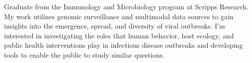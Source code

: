 
\begin{cvparagraph}

    Graduate from the Immunology and Microbiology program at Scripps Research.
    My work utilizes genomic surveillance and multimodal data sources to gain insights into the emergence, spread, and diversity of viral outbreaks.
    I'm interested in investigating the roles that human behavior, host ecology, and public health interventions play in infectious disease outbreaks and developing tools to enable the         public to study similar questions. 
\end{cvparagraph}
